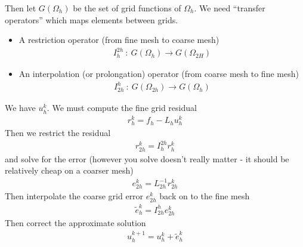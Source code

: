 \documentclass{article}
\newcommand{\f}[3]{#1\ :\ #2 \rightarrow #3}
\begin{document}
        Then let $G(\Omega_h)$ be the set of grid functions of $\Omega_h$.  We need ``transfer operators'' which maps elements between grids.
        \begin{itemize}
            \item A restriction operator (from fine mesh to coarse mesh)
            \begin{align*}
                \f{I_h^{2h}}{G(\Omega_h)}{G(\Omega_{2H})}
            \end{align*}
            \item An interpolation (or prolongation) operator (from coarse mesh to fine mesh)
            \begin{align*}
                \f{I_{2h}^h}{G(\Omega_{2h})}{G(\Omega_h)}
            \end{align*}
        \end{itemize}
        We have $u_h^k$.  We must compute the fine grid residual
        \begin{align*}
            r_h^k = f_h - L_hu_h^k
        \end{align*}
        Then we restrict the residual
        \begin{align*}
            r_{2h}^k = I_h^{2h}r_h^k
        \end{align*}
        and solve for the error (however you solve doesn't really matter - it should be relatively cheap on a coarser mesh)
        \begin{align*}
            e_{2h}^k = L_{2h}^{-1}r_{2h}^k
        \end{align*}
        Then interpolate the coarse grid error $e_{2h}^k$ back on to the fine mesh
        \begin{align*}
            \tilde{e}_h^k = I_{2h}^he_{2h}^k
        \end{align*}
        Then correct the approximate solution
        \begin{align*}
            u_h^{k+1} = u_h^k + \tilde{e}_h^k
        \end{align*}
\end{document}
